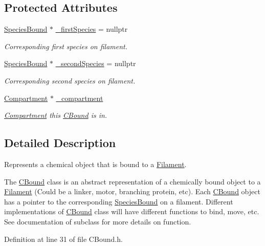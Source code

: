 \subsection*{Protected Attributes}
\begin{DoxyCompactItemize}
\item 
\hyperlink{classSpeciesBound}{Species\+Bound} $\ast$ \hyperlink{classCBound_a7ee4f44fd39c414be1f7b74b1031c1ce}{\+\_\+first\+Species} = nullptr
\begin{DoxyCompactList}\small\item\em Corresponding first species on filament. \end{DoxyCompactList}\item 
\hyperlink{classSpeciesBound}{Species\+Bound} $\ast$ \hyperlink{classCBound_ae6818ab861d273598a2507be75183e41}{\+\_\+second\+Species} = nullptr
\begin{DoxyCompactList}\small\item\em Corresponding second species on filament. \end{DoxyCompactList}\item 
\hyperlink{classCompartment}{Compartment} $\ast$ \hyperlink{classCBound_a95a66719b898cf32e60ae7137186bbbf}{\+\_\+compartment}
\begin{DoxyCompactList}\small\item\em \hyperlink{classCompartment}{Compartment} this \hyperlink{classCBound}{C\+Bound} is in. \end{DoxyCompactList}\end{DoxyCompactItemize}


\subsection{Detailed Description}
Represents a chemical object that is bound to a \hyperlink{classFilament}{Filament}. 

The \hyperlink{classCBound}{C\+Bound} class is an abstract representation of a chemically bound object to a \hyperlink{classFilament}{Filament} (Could be a linker, motor, branching protein, etc). Each \hyperlink{classCBound}{C\+Bound} object has a pointer to the corresponding \hyperlink{classSpeciesBound}{Species\+Bound} on a filament. Different implementations of \hyperlink{classCBound}{C\+Bound} class will have different functions to bind, move, etc. See documentation of subclass for more details on function. 

Definition at line 31 of file C\+Bound.\+h.



